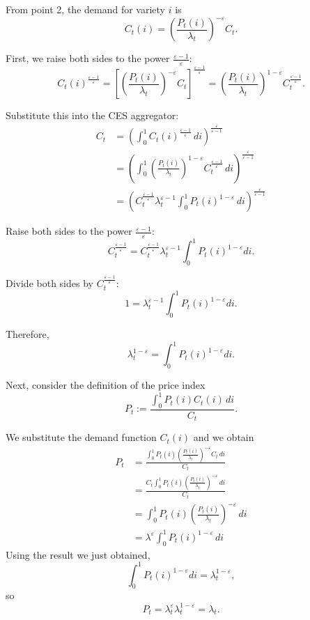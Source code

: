\documentclass[dvipsnames,11pt]{article}
\begin{document}
\begin{enumerate}
\begin{solution}

From point 2, the demand for variety \(i\) is
\[
C_t(i)=\left(\frac{P_t(i)}{\lambda_t}\right)^{-\varepsilon} C_t.
\]

First, we raise both sides to the power \(\frac{\varepsilon-1}{\varepsilon}\):
\[
C_t(i)^{\frac{\varepsilon-1}{\varepsilon}}
=
\left[\left(\frac{P_t(i)}{\lambda_t}\right)^{-\varepsilon} C_t\right]^{\frac{\varepsilon-1}{\varepsilon}}
=
\left(\frac{P_t(i)}{\lambda_t}\right)^{1-\varepsilon}
C_t^{\frac{\varepsilon-1}{\varepsilon}}.
\]

Substitute this into the CES aggregator:
\begin{align*}
C_t
& =
\left(\int_0^1 C_t(i)^{\frac{\varepsilon-1}{\varepsilon}}\,di\right)^{\frac{\varepsilon}{\varepsilon-1}} \\
& = \left(\int_0^1 \left(\frac{P_t(i)}{\lambda_t}\right)^{1-\varepsilon}
C_t^{\frac{\varepsilon-1}{\varepsilon}}\,di\right)^{\frac{\varepsilon}{\varepsilon-1}} \\
& = \left( C_t^{\frac{\varepsilon-1}{\varepsilon}} \lambda_t^{\varepsilon - 1}  \int_0^1 P_t(i)^{1-\varepsilon}
\,di\right) ^{\frac{\varepsilon}{\varepsilon-1}}
\end{align*}

Raise both sides to the power \(\frac{\varepsilon-1}{\varepsilon}\):
\[
C_t^{\frac{\varepsilon-1}{\varepsilon}}
=
C_t^{\frac{\varepsilon-1}{\varepsilon}}
\lambda_t^{\varepsilon-1}
\int_0^1 P_t(i)^{1-\varepsilon}di.
\]

Divide both sides by \(C_t^{\frac{\varepsilon-1}{\varepsilon}}\):
\[
1=\lambda_t^{\varepsilon-1}\int_0^1 P_t(i)^{1-\varepsilon}di.
\]

Therefore, 
\[
\lambda_t^{1-\varepsilon}=\int_0^1 P_t(i)^{1-\varepsilon}di.
\]

Next, consider the definition of the price index
\[
P_t:=\frac{\int_0^1 P_t(i)C_t(i)\,di}{C_t}.
\]

We substitute the demand function $C_t(i)$ and we obtain
\begin{align*}
P_t
& =
\frac{\int_0^1 P_t(i)\left(\frac{P_t(i)}{\lambda_t}\right)^{-\varepsilon}C_t\,di}{C_t} \\
& = \frac{C_t \int_0^1 P_t(i)\left(\frac{P_t(i)}{\lambda_t}\right)^{-\varepsilon}\,di}{C_t} \\
& = \int_0^1 P_t(i)\left(\frac{P_t(i)}{\lambda_t}\right)^{-\varepsilon}\,di \\
& = \lambda ^\varepsilon \int_0^1 P_t(i)^{1 - \varepsilon} \, di
\end{align*}
Using the result we just obtained,
\[
\int_0^1 P_t(i)^{1-\varepsilon}di=\lambda_t^{1-\varepsilon},
\]
so
\[
P_t=\lambda_t^\varepsilon \lambda_t^{1-\varepsilon}=\lambda_t.
\]


\end{solution}
\end{enumerate}
\end{document}
